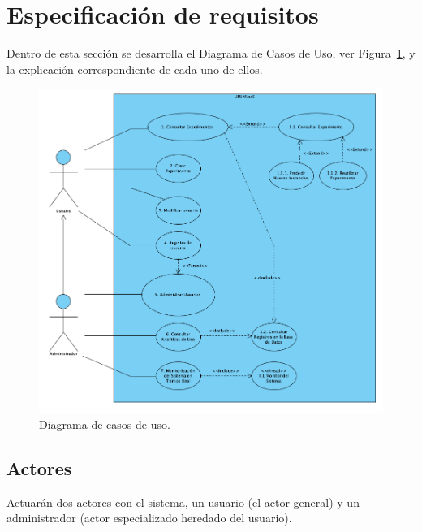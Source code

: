 \section{Especificación de requisitos}

Dentro de esta sección se desarrolla el Diagrama de Casos de Uso, ver Figura~\ref{img:diagrama-casos-uso}, y la explicación correspondiente de cada uno de ellos.

\begin{figure}[h!]
	\centering
	\includegraphics[scale=0.5]{../img/anexos/requisitos/casos_de_uso}
	\caption{Diagrama de casos de uso.}\label{img:diagrama-casos-uso}
\end{figure}

\subsection{Actores}
Actuarán dos actores con el sistema, un usuario (el actor general) y un administrador (actor especializado heredado del usuario).

